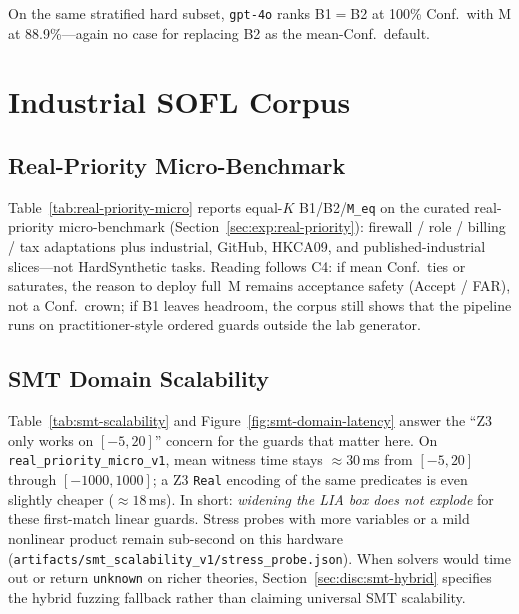 

On the same stratified hard subset, \texttt{gpt-4o} ranks
B1${=}$B2 at 100\% Conf.\ with M at 88.9\%---again no case for replacing B2
as the mean-Conf.\ default.

\section{Industrial SOFL Corpus}
\label{sec:results:industrial}

\subsection{Real-Priority Micro-Benchmark}
\label{sec:results:real-priority}

Table~\ref{tab:real-priority-micro} reports equal-$K$ B1/B2/\texttt{M\_eq}
on the curated real-priority micro-benchmark
(Section~\ref{sec:exp:real-priority}): firewall / role / billing / tax
adaptations plus industrial, GitHub, HKCA09, and published-industrial
slices---not HardSynthetic tasks.
Reading follows C4: if mean Conf.\ ties or saturates, the reason to deploy
full~M remains acceptance safety (Accept / FAR), not a Conf.\ crown; if B1
leaves headroom, the corpus still shows that the pipeline runs on
practitioner-style ordered guards outside the lab generator.



\subsection{SMT Domain Scalability}
\label{sec:results:smt-scalability}

Table~\ref{tab:smt-scalability} and Figure~\ref{fig:smt-domain-latency}
answer the ``Z3 only works on $[-5,20]$'' concern for the guards that
matter here.
On \texttt{real\_priority\_micro\_v1}, mean witness time stays
${\approx}30$\,ms from $[-5,20]$ through $[-1000,1000]$; a Z3
\texttt{Real} encoding of the same predicates is even slightly cheaper
(${\approx}18$\,ms).
In short: \emph{widening the LIA box does not explode} for these
first-match linear guards.
Stress probes with more variables or a mild nonlinear product remain
sub-second on this hardware
(\texttt{artifacts/smt\_scalability\_v1/stress\_probe.json}).
When solvers would time out or return \texttt{unknown} on richer theories,
Section~\ref{sec:disc:smt-hybrid} specifies the hybrid fuzzing fallback
rather than claiming universal SMT scalability.

